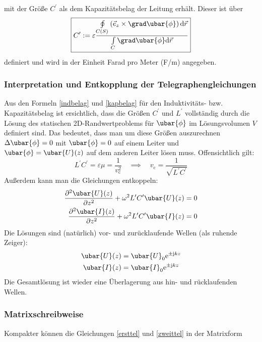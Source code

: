 mit der Größe $C^{\prime}$ als dem Kapazitätsbelag der Leitung erhält. Dieser ist über
\begin{equation}\label{kapbelag}
	\boxed{C^{\prime}:=\varepsilon \frac{\oint\limits_{C(S)}\left(\vec{e}_{z} \times \grad \ubar{\phi}\right) \mathrm{d} \vec{r}}{\int\limits_{C} \grad \ubar{\phi} \mathrm{d} \vec{r}}} 
\end{equation}
definiert und wird in der Einheit Farad pro Meter (F/m) angegeben. 
\subsubsection{Interpretation und Entkopplung der Telegraphengleichungen}
Aus den Formeln \ref{indbelag} und \ref{kapbelag} für den Induktivitäts- bzw. Kapazitätsbelag ist ersichtlich, dass die Größen $C^\prime$ und $L^\prime$ vollständig durch die Lösung des statischen 2D-Randwertproblems für $\ubar{\phi}$ im Lösungsvolumen $V$ definiert sind. Das bedeutet, dass man um diese Größen auszurechnen $\Delta \ubar{\phi}=0$ mit $\ubar{\phi}=0$ auf einem Leiter und $\ubar{\phi}=\ubar{U}(z)$ auf dem anderen Leiter lösen muss. %
Offensichtlich gilt:
\begin{equation}
	L^\prime C^\prime =\varepsilon\mu=\frac{1}{v_\mathrm{c}^2}\quad \implies \quad \boxed{v_\mathrm{c}=\frac{1}{\sqrt{L^\prime C^\prime}}}
\end{equation}
Außerdem kann man die Gleichungen entkoppeln:
	\begin{equation}\label{entkoptel}\begin{split}
	\frac{\partial^2  \ubar{U}(z)}{\partial z^2} + \omega^2 L^\prime C^\prime  \ubar{U}(z) &= 0 \\
	 \frac{\partial^2  \ubar{I}(z)}{\partial z^2} + \omega^2 L^\prime C^\prime  \ubar{I}(z) &= 0
\end{split}\end{equation}
Die Lösungen sind (natürlich) vor- und zurücklaufende Wellen (als ruhende Zeiger):
\begin{equation}\begin{split}
	\ubar{U}(z) &=  \ubar{U}_0  \mathrm{e}^{\pm\mathrm{j}kz} \\
	  \ubar{I}(z)& =  \ubar{I}_0  \mathrm{e}^{\pm\mathrm{j}kz}
	\end{split}\end{equation}
Die Gesamtlösung ist wieder eine Überlagerung aus hin- und rücklaufenden Wellen.
\subsubsection{Matrixschreibweise}
Kompakter können die Gleichungen \ref{ersttel} und \ref{zweittel} in der Matrixform

